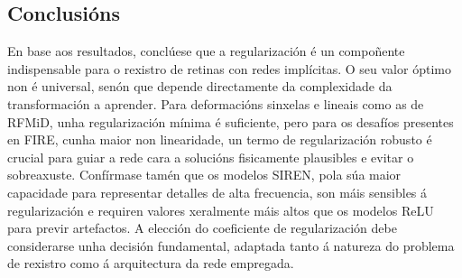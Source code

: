 






\subsection{Conclusións}
\label{subsec:Conclusions-regularization}

En base aos resultados, conclúese que a regularización é un compoñente indispensable para o rexistro de retinas con redes implícitas. O seu valor óptimo non é universal, senón que depende directamente da complexidade da transformación a aprender. Para deformacións sinxelas e lineais como as de RFMiD, unha regularización mínima é suficiente, pero para os desafíos presentes en FIRE, cunha maior non linearidade, un termo de regularización robusto é crucial para guiar a rede cara a solucións fisicamente plausibles e evitar o sobreaxuste. Confírmase tamén que os modelos SIREN, pola súa maior capacidade para representar detalles de alta frecuencia, son máis sensibles á regularización e requiren valores xeralmente máis altos que os modelos ReLU para previr artefactos. A elección do coeficiente de regularización debe considerarse unha decisión fundamental, adaptada tanto á natureza do problema de rexistro como á arquitectura da rede empregada.


